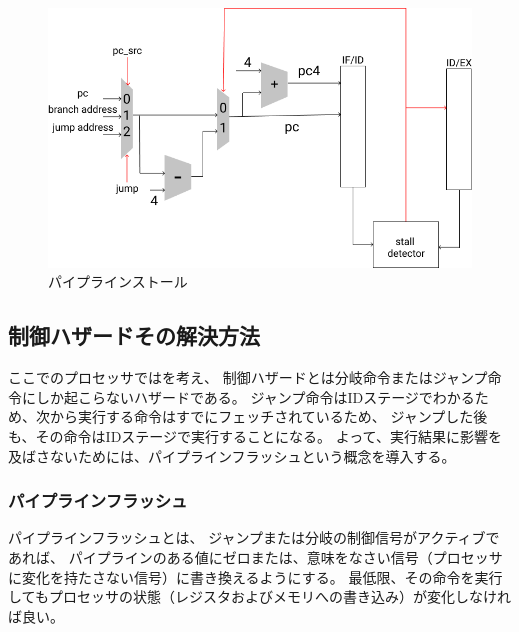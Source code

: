 \documentclass[../main.tex]{subfiles}
\begin{document}
            \begin{figure}[h]
                \centering
                \includegraphics[width = 1.5\columnwidth]{../images/stall.png}
                \caption{パイプラインストール}
                \label{fig:stall}
            \end{figure}

    \subsection{制御ハザードその解決方法}
        ここでのプロセッサではを考え、
        制御ハザードとは分岐命令またはジャンプ命令にしか起こらないハザードである。
        ジャンプ命令はIDステージでわかるため、次から実行する命令はすでにフェッチされているため、
        ジャンプした後も、その命令はIDステージで実行することになる。
        よって、実行結果に影響を及ばさないためには、パイプラインフラッシュという概念を導入する。

    \subsubsection{パイプラインフラッシュ}
        パイプラインフラッシュとは、
        ジャンプまたは分岐の制御信号がアクティブであれば、
        パイプラインのある値にゼロまたは、意味をなさい信号（プロセッサに変化を持たさない信号）に書き換えるようにする。
        最低限、その命令を実行してもプロセッサの状態（レジスタおよびメモリへの書き込み）が変化しなければ良い。
\end{document}
